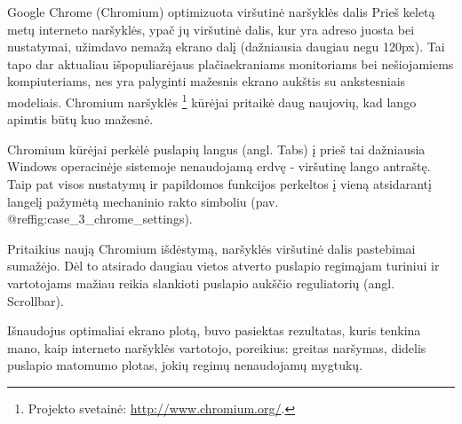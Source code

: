 \begin{xcase}{Google Chrome (Chromium) optimizuota viršutinė naršyklės dalis}
  \xcgoal
  {
  	Prieš keletą metų interneto naršyklės, ypač jų viršutinė dalis, kur yra adreso
	juosta bei nustatymai, užimdavo nemažą ekrano dalį (dažniausia daugiau negu 120px).
	Tai tapo dar aktualiau išpopuliarėjaus 
	plačiaekraniams monitoriams bei nešiojamiems kompiuteriams, nes yra palyginti 
	mažesnis ekrano aukštis su ankstesniais modeliais. Chromium naršyklės
	\footnote{Projekto svetainė: \url{http://www.chromium.org/}.} kūrėjai pritaikė 
	daug naujovių, kad lango apimtis būtų kuo mažesnė.
  }
  
  \xctools
  {
    Chromium kūrėjai perkėlė puslapių langus (angl. Tabs) į prieš tai dažniausia 
	Windows operacinėje sistemoje nenaudojamą erdvę - viršutinę lango antraštę.
	Taip pat visos nustatymų ir papildomos funkcijos perkeltos į vieną atsidarantį
	langelį pažymėtą mechaninio rakto simboliu (pav. @ref{fig:case_3_chrome_settings}).
	
    {
    }
  }
  
  \xcresult
  {
  	Pritaikius naują Chromium išdėstymą, naršyklės viršutinė dalis pastebimai sumažėjo.
	Dėl to atsirado daugiau vietos atverto puslapio regimąjam turiniui ir vartotojams 
	mažiau reikia slankioti puslapio aukščio reguliatorių (angl. Scrollbar).
  }
  
  \xcprinciples
  {
  }
  
  \xcthoughts
  {
    Išnaudojus optimaliai ekrano plotą, buvo pasiektas rezultatas, kuris tenkina mano,
	kaip interneto naršyklės vartotojo, poreikius: greitas naršymas, didelis puslapio
	matomumo plotas, jokių regimų nenaudojamų mygtukų.
  }
\end{xcase}
